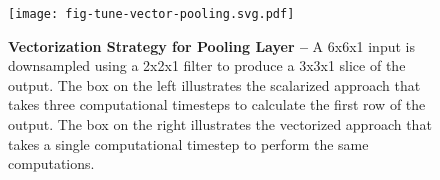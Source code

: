 
\begin{figure}[h]

  \centering
  \texttt{[image: fig-tune-vector-pooling.svg.pdf]}

  \caption{\textbf{Vectorization Strategy for Pooling Layer --} A 6x6x1
    input is downsampled using a 2x2x1 filter to produce a 3x3x1 slice of
    the output. The box on the left illustrates the scalarized approach
    that takes three computational timesteps to calculate the first row
    of the output. The box on the right illustrates the vectorized
    approach that takes a single computational timestep to perform the
    same computations.}

  \label{fig-tuning-vectorization-pooling}

\end{figure}
